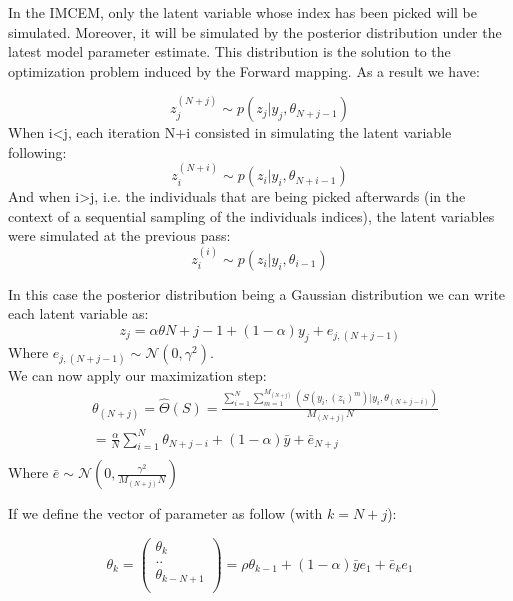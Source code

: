 \documentclass[a4paper]{article}
\theoremstyle{plain}
\theoremstyle{plain}
\theoremstyle{definition}
\begin{document}
In the IMCEM, only the latent variable whose index has been picked will be simulated. Moreover, it will be simulated by the posterior distribution under the latest model parameter estimate. This distribution is the solution to the optimization problem induced by the Forward mapping. As a result we have:

\begin{equation}
z_j^{(N+j)} \sim p(z_j|y_j,\theta_{N+j-1})
\end{equation}
When i<j, each iteration N+i consisted in simulating the latent variable following:
\begin{equation}
z_i^{(N+i)} \sim p(z_i|y_i,\theta_{N+i-1})
\end{equation}
And when i>j, i.e. the individuals that are being picked afterwards (in the context of a sequential sampling of the individuals indices), the latent variables were simulated at the previous pass:
\begin{equation}
z_i^{(i)} \sim p(z_i|y_i,\theta_{i-1})
\end{equation}

In this case the posterior distribution being a Gaussian distribution we can write each latent variable as:
\begin{equation}
z_j = \alpha \theta{N+j-1} + (1-\alpha)y_j + e_{j,(N+j-1)}
\end{equation}
Where $e_{j,(N+j-1)} \sim \mathcal{N}(0, \gamma^2)$.\\

\noindent We can now apply our maximization step:
\begin{equation}
\begin{split}
& \theta_{(N+j)} = \hat{\Theta}(S) = \frac{\sum_{i=1}^{N}{\sum_{m=1}^{M_(N+j)}{(S(y_i,(z_i)^m)|y_i,\theta_{(N+j-i)})}}}{M_(N+j)N}\\
& = \frac{\alpha}{N} \sum_{i=1}^{N}{\theta_{N+j-i}} + (1-\alpha)\bar{y} + \bar{e}_{N+j}\\
\end{split}
\end{equation}
Where $\bar{e} \sim \mathcal{N}(0, \frac{\gamma^2}{M_(N+j)N})$

If we define the vector of parameter as follow (with $k=N+j$):

\begin{equation}
\theta_{k} = 
\left(
\begin{array}{c}
\theta_{k}\\
..\\
\theta_{k-N+1}\\
\end{array}
\right) = \rho \theta_{k-1} + (1-\alpha)\bar{y}e_1 + \bar{e}_k e_1
\end{equation}
\end{document}

